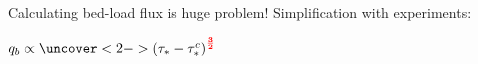 \documentclass{beamer}
\newcommand{\topline}{%
 \tikz[remember picture,overlay] {%
   \draw[black!100] ([yshift=-1cm]current page.north west)
            --([yshift=-1cm,xshift=\paperwidth]current page.north west);}}
\begin{document}
\begin{frame}[t]%
  Calculating bed-load flux is huge problem! Simplification with experiments:

  {\huge
  $
  q_b \propto \uncover<2->{\left(\tau_* - \tau_*^c \right)^{\color{red}\frac{\mathbf{3}}{\mathbf{2}}}}
  $}

  \vspace{0.3cm}




\end{frame}
\end{document}
